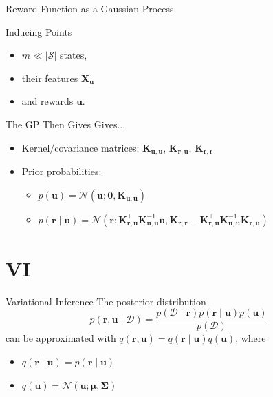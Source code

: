 \documentclass{beamer}
\newcommand{\Kuu}{\mathbf{K}_{\mathbf{u},\mathbf{u}}}
\newcommand{\Krr}{\mathbf{K}_{\mathbf{r},\mathbf{r}}}
\newcommand{\Kru}{\mathbf{K}_{\mathbf{r},\mathbf{u}}}
\begin{document}
\begin{frame}{Reward Function as a Gaussian Process}
    \begin{block}{Inducing Points}
      \begin{itemize}
      \item $m \ll |\mathcal{S}|$ states,
      \item their features $\mathbf{X_u}$
      \item and rewards $\mathbf{u}$.
      \end{itemize}
    \end{block}

  \begin{block}{The GP Then Gives Gives...}
    \begin{itemize}
    \item Kernel/covariance matrices: $\Kuu$, $\Kru$, $\Krr$
    \item Prior probabilities:
      \begin{itemize}
      \item $p(\mathbf{u}) = \mathcal{N}(\mathbf{u}; \mathbf{0}, \Kuu)$
      \item $p(\mathbf{r} \mid \mathbf{u}) = \mathcal{N}(\mathbf{r};
        \Kru^\intercal\Kuu^{-1}\mathbf{u}, \Krr - \Kru^\intercal\Kuu^{-1}\Kru)$
      \end{itemize}
    \end{itemize}
  \end{block}
\end{frame}

\section{VI}

\begin{frame}{Variational Inference}
  The posterior distribution
  \[
    p(\mathbf{r}, \mathbf{u} \mid \mathcal{D}) = \frac{p(\mathcal{D} \mid
      \mathbf{r})p(\mathbf{r} \mid \mathbf{u})p(\mathbf{u})}{p(\mathcal{D})}
  \]
  can be approximated with $q(\mathbf{r}, \mathbf{u}) = q(\mathbf{r} \mid
  \mathbf{u})q(\mathbf{u})$, where
  \begin{itemize}
  \item $q(\mathbf{r} \mid \mathbf{u}) = p(\mathbf{r} \mid \mathbf{u})$
  \item $q(\mathbf{u}) = \mathcal{N}(\mathbf{u}; \bm\mu, \bm\Sigma)$
  \end{itemize}
\end{frame}
\end{document}
